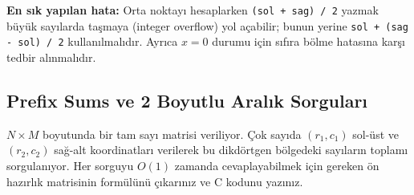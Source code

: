 \textbf{En sık yapılan hata:} Orta noktayı hesaplarken \texttt{(sol + sag) / 2} yazmak büyük sayılarda taşmaya (integer overflow) yol açabilir; bunun yerine \texttt{sol + (sag - sol) / 2} kullanılmalıdır. Ayrıca $x = 0$ durumu için sıfıra bölme hatasına karşı tedbir alınmalıdır.

\subsection{Prefix Sums ve 2 Boyutlu Aralık Sorguları}

\begin{example}
$N \times M$ boyutunda bir tam sayı matrisi veriliyor. Çok sayıda $(r_1, c_1)$ sol-üst ve $(r_2, c_2)$ sağ-alt koordinatları verilerek bu dikdörtgen bölgedeki sayıların toplamı sorgulanıyor. Her sorguyu $O(1)$ zamanda cevaplayabilmek için gereken ön hazırlık matrisinin formülünü çıkarınız ve C kodunu yazınız.
\end{example}

